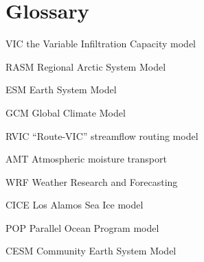 %
%
\tableofcontents
\listoffigures
\listoftables

\chapter*{Glossary}      %
\thispagestyle{plain}
%
\begin{glossary}
\item[VIC] the Variable Infiltration Capacity model
\item[RASM] Regional Arctic System Model
\item[ESM] Earth System Model
\item[GCM] Global Climate Model
\item[RVIC] ``Route-VIC'' streamflow routing model
\item[AMT] Atmospheric moisture transport
\item[WRF] Weather Research and Forecasting
\item[CICE] Los Alamos Sea Ice model
\item[POP] Parallel Ocean Program model
\item[CESM] Community Earth System Model
\end{glossary}

